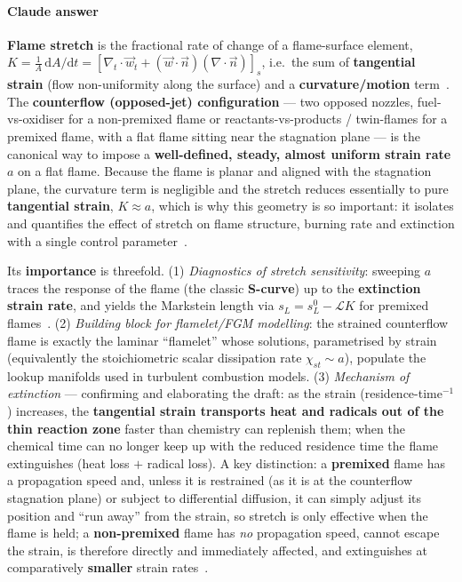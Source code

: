 {\color{istblue}
\paragraph{Claude answer}
\textbf{Flame stretch} is the fractional rate of change of a flame-surface element, $K = \tfrac{1}{A}\,\mathrm{d}A/\mathrm{d}t = [\nabla_t\cdot\vec w_t + (\vec w\cdot\vec n)(\nabla\cdot\vec n)]_s$, i.e.\ the sum of \textbf{tangential strain} (flow non-uniformity along the surface) and a \textbf{curvature/motion} term~\cite{Law1988,lecture9}. The \textbf{counterflow (opposed-jet) configuration} --- two opposed nozzles, fuel-vs-oxidiser for a non-premixed flame or reactants-vs-products / twin-flames for a premixed flame, with a flat flame sitting near the stagnation plane --- is the canonical way to impose a \textbf{well-defined, steady, almost uniform strain rate} $a$ on a flat flame. Because the flame is planar and aligned with the stagnation plane, the curvature term is negligible and the stretch reduces essentially to pure \textbf{tangential strain}, $K \approx a$, which is why this geometry is so important: it isolates and quantifies the effect of stretch on flame structure, burning rate and extinction with a single control parameter~\cite{lecture9,Law1988,poinsot2012theoretical}.

Its \textbf{importance} is threefold. (1) \emph{Diagnostics of stretch sensitivity}: sweeping $a$ traces the response of the flame (the classic \textbf{S-curve}) up to the \textbf{extinction strain rate}, and yields the Markstein length via $s_L = s_L^0 - \mathcal{L}K$ for premixed flames~\cite{Law1988,lecture9}. (2) \emph{Building block for flamelet/FGM modelling}: the strained counterflow flame is exactly the laminar ``flamelet'' whose solutions, parametrised by strain (equivalently the stoichiometric scalar dissipation rate $\chi_{st}\sim a$), populate the lookup manifolds used in turbulent combustion models. (3) \emph{Mechanism of extinction} --- confirming and elaborating the draft: as the strain (residence-time$^{-1}$) increases, the \textbf{tangential strain transports heat and radicals out of the thin reaction zone} faster than chemistry can replenish them; when the chemical time can no longer keep up with the reduced residence time the flame extinguishes (heat loss $+$ radical loss). A key distinction: a \textbf{premixed} flame has a propagation speed and, unless it is restrained (as it is at the counterflow stagnation plane) or subject to differential diffusion, it can simply adjust its position and ``run away'' from the strain, so stretch is only effective when the flame is held; a \textbf{non-premixed} flame has \emph{no} propagation speed, cannot escape the strain, is therefore directly and immediately affected, and extinguishes at comparatively \textbf{smaller} strain rates~\cite{lecture9,Law1988,warnatz2006combustion}.
}




